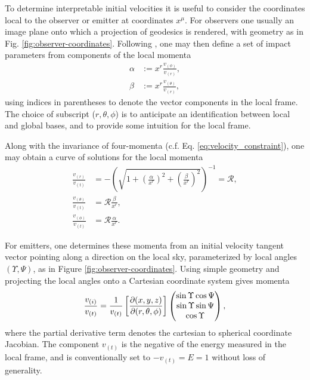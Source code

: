 To determine interpretable initial velocities it is useful to consider the coordinates local to the observer or emitter at coordinates $x^\mu$. For observers one usually an image plane onto which a projection of geodesics is rendered, with geometry as in Fig. \ref{fig:observer-coordinates}. Following \cite{cunningham_optical_1973}, one may then define a set of impact parameters from components of the local momenta
\begin{align}
    \alpha &:=  x^r \frac{v_{(\phi)}}{v_{(r)}}, \\
    \beta &:= x^r \frac{v_{(\theta)}}{v_{(r)}},
\end{align}
using indices in parentheses to denote the vector components in the local frame. The choice of subscript ($r, \theta, \phi$) is to anticipate an identification between local and global bases, and to provide some intuition for the local frame.

Along with the invariance of four-momenta (c.f. Eq. \eqref{eq:velocity_constraint}), one may obtain a curve of solutions for the local momenta
\begin{align}
    \frac{v_{(r)}}{v_{(t)}} &= -\left( \sqrt{1 + \left(\frac{\alpha}{x^r}\right)^2 + \left(\frac{\beta}{x^r}\right)^2} \right)^{-1} = \mathscr{R}, \\
    \frac{v_{(\theta)}}{v_{(t)}} &= \mathscr{R} \frac{\beta}{x^r}, \\
    \frac{v_{(\phi)}}{v_{(t)}} &= \mathscr{R} \frac{\alpha}{x^r}.
\end{align}

For emitters, one determines these momenta from an initial velocity tangent vector pointing along a direction on the local sky, parameterized by local angles $(\Upsilon, \Psi)$, as in Figure \ref{fig:observer-coordinates}. Using simple geometry and projecting the local angles onto a Cartesian coordinate system gives momenta
\begin{equation}
    \label{eq:local-angle-to-velocity}
    \frac{v_{(i)}}{v_{(t)}} = \frac{1}{v_{(t)}}
    \left[\frac{\partial (x, y, z)}{\partial (r, \theta, \phi)}\right]
    \left(
    \begin{matrix}
        \sin \Upsilon \cos \Psi \\
        \sin \Upsilon \sin \Psi \\
        \cos \Upsilon \\
    \end{matrix}
    \right),
\end{equation}
where the partial derivative term denotes the cartesian to spherical coordinate Jacobian. The component $v_{(t)}$ is the negative of the energy measured in the local frame, and is conventionally set to $-v_{(t)} = E = 1$ without loss of generality. 

